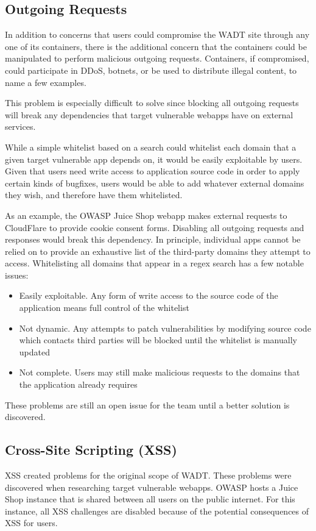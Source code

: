 \documentclass[12pt,titlepage]{article}
\begin{document}
\subsection{Outgoing Requests}
In addition to concerns that users could compromise the WADT site through any one of its containers, there is the additional concern that the containers could be manipulated to perform malicious outgoing requests. Containers, if compromised, could participate in DDoS, botnets, or be used to distribute illegal content, to name a few examples.

This problem is especially difficult to solve since blocking all outgoing requests will break any dependencies that target vulnerable webapps have on external services.

While a simple whitelist based on a search could whitelist each domain that a given target vulnerable app depends on, it would be easily exploitable by users. Given that users need write access to application source code in order to apply certain kinds of bugfixes, users would be able to add whatever external domains they wish, and therefore have them whitelisted.

As an example, the OWASP Juice Shop webapp makes external requests to CloudFlare to provide cookie consent forms. Disabling all outgoing requests and responses would break this dependency. In principle, individual apps cannot be relied on to provide an exhaustive list of the third-party domains they attempt to access. Whitelisting all domains that appear in a regex search has a few notable issues:

\begin{itemize}
	\item Easily exploitable. Any form of write access to the source code of the application means full control of the whitelist
	\item Not dynamic. Any attempts to patch vulnerabilities by modifying source code which contacts third parties will be blocked until the whitelist is manually updated
	\item Not complete. Users may still make malicious requests to the domains that the application already requires
\end{itemize}

These problems are still an open issue for the team until a better solution is discovered.

\subsection{Cross-Site Scripting (XSS)}
XSS created problems for the original scope of WADT. These problems were discovered when researching target vulnerable webapps. OWASP hosts a Juice Shop instance that is shared between all users on the public internet. For this instance, all XSS challenges are disabled because of the potential consequences of XSS for users.
\end{document}
